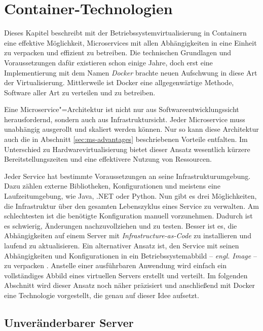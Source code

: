 \chapter{Container-Technologien}
\label{chap:containers}

Dieses Kapitel beschreibt mit der Betriebssystemvirtualisierung in Containern eine effektive Möglichkeit, Microservices mit allen Abhängigkeiten in eine Einheit zu verpacken und effizient zu betreiben. Die technischen Grundlagen und Voraussetzungen dafür existieren schon einige Jahre, doch erst eine Implementierung mit dem Namen \textit{Docker} brachte neuen Aufschwung in diese Art der Virtualisierung. Mittlerweile ist Docker eine allgegenwärtige Methode, Software aller Art zu verteilen und zu betreiben.

Eine Microservice"=Architektur ist nicht nur aus Softwareentwicklungssicht herausfordernd, sondern auch aus Infrastruktursicht. Jeder Microservice muss unabhängig ausgerollt und skaliert werden können. Nur so kann diese Architektur auch die in Abschnitt \ref{sec:ms-advantages} beschriebenen Vorteile entfalten. Im Unterschied zu Hardwarevirtualisierung bietet dieser Ansatz wesentlich kürzere Bereitstellungszeiten und eine effektivere Nutzung von Ressourcen.

Jeder Service hat bestimmte Voraussetzungen an seine Infrastrukturumgebung. Dazu zählen externe Bibliotheken, Konfigurationen und meistens eine Laufzeitumgebung, wie \zB Java, .NET oder Python. Nun gibt es drei Möglichkeiten, die Infrastruktur über den gesamten Lebenszyklus eines Service zu verwalten. Am schlechtesten ist die benötigte Konfiguration manuell vorzunehmen. Dadurch ist es schwierig, Änderungen nachzuvollziehen und zu testen. Besser ist es, die Abhängigkeiten auf einem Server mit \textit{Infrastructure-as-Code} zu installieren und laufend zu aktualisieren. Ein alternativer Ansatz ist, den Service mit seinen Abhängigkeiten und Konfigurationen in ein Betriebssystemabbild -- \textit{engl. Image} -- zu verpacken \cite[113]{newman2015building}. Anstelle einer ausführbaren Anwendung wird einfach ein vollständiges Abbild eines virtuellen Servers erstellt und verteilt. Im folgenden Abschnitt wird dieser Ansatz noch näher präzisiert und anschließend mit \mbox{Docker} eine Technologie vorgestellt, die genau auf dieser Idee aufsetzt.

\section{Unveränderbarer Server}
\label{sec:immutable-server}

